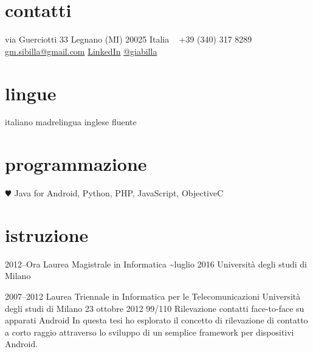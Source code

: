 \documentclass[print]{friggeri-custom} %
\begin{document}


\begin{aside} %
\section{contatti}
via Guerciotti 33
Legnano (MI) 20025
Italia
~
+39 (340) 317 8289
~
\href{mailto:gm.sibilla@gmail.com}{gm.sibilla@gmail.com}
\href{https://it.linkedin.com/in/gmbilla}{LinkedIn}
\href{https://twitter.com/giabilla}{@giabilla}
\section{lingue}
italiano madrelingua
inglese fluente
\section{programmazione}
{\color{red} $\varheartsuit$} Java for Android, Python, PHP, JavaScript, ObjectiveC
\end{aside}


\section{istruzione}

\begin{entrylist}


\entry
{2012--Ora}
{Laurea Magistrale {\normalfont in Informatica}}
{\textasciitilde luglio 2016}
{Università degli studi di Milano}


\eduentry
{2007--2012}
{Laurea Triennale {\normalfont in Informatica per le Telecomunicazioni}}
{Università degli studi di Milano}
{23 ottobre 2012}
{99/110}
{Rilevazione contatti face-to-face su apparati Android}
{In questa tesi ho esplorato il concetto di rilevazione di contatto a corto raggio attraverso lo sviluppo di un semplice framework per dispositivi Android.}


\end{entrylist}
\end{document}
